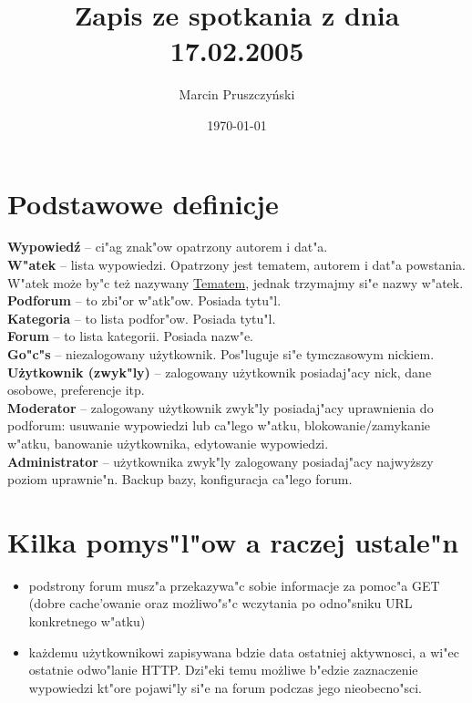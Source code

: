 \documentclass[12pt,a4paper,twoside]{article}
\author{Marcin Pruszczy\'nski}
\title{Zapis ze spotkania z dnia 17.02.2005}
\date{\today}
\begin{document}
\maketitle

\section{Podstawowe definicje}
\textbf{Wypowied\'z} -- ci"ag znak"ow opatrzony autorem i dat"a. \\
\textbf{W"atek} -- lista wypowiedzi. Opatrzony jest tematem, autorem i dat"a powstania. W"atek mo\.ze by"c te\.z nazywany \underline{Tematem}, jednak trzymajmy si"e nazwy w"atek. \\
\textbf{Podforum} -- to zbi"or w"atk"ow. Posiada tytu"l.\\
\textbf{Kategoria} -- to lista podfor"ow. Posiada tytu"l.\\
\textbf{Forum} -- to lista kategorii. Posiada nazw"e.\\
\textbf{Go"c"s} -- niezalogowany u\.zytkownik. Pos"luguje si"e tymczasowym nickiem.\\
\textbf{U\.zytkownik (zwyk"ly)} -- zalogowany u\.zytkownik posiadaj"acy nick, dane osobowe, preferencje itp.\\
\textbf{Moderator} -- zalogowany u\.zytkownik zwyk"ly posiadaj"acy uprawnienia do podforum: usuwanie wypowiedzi lub ca"lego w"atku, blokowanie/zamykanie w"atku, banowanie u\.zytkownika, edytowanie wypowiedzi.\\
\textbf{Administrator} -- u\.zytkownika zwyk"ly zalogowany posiadaj"acy najwy\.zszy poziom uprawnie"n. Backup bazy, konfiguracja ca"lego forum.\\

\section{Kilka pomys"l"ow a raczej ustale"n}
\begin{itemize}
\item podstrony forum musz"a przekazywa"c sobie informacje za pomoc"a GET (dobre cache'owanie oraz mo\.zliwo"s"c wczytania po odno"sniku URL konkretnego w"atku)
\item ka\.zdemu u\.zytkownikowi zapisywana bdzie data ostatniej aktywnosci, a wi"ec ostatnie odwo"lanie HTTP. Dzi"eki temu mo\.zliwe b"edzie zaznaczenie wypowiedzi kt"ore pojawi"ly si"e na forum podczas jego nieobecno"sci.
\end{itemize}
\end{document}
